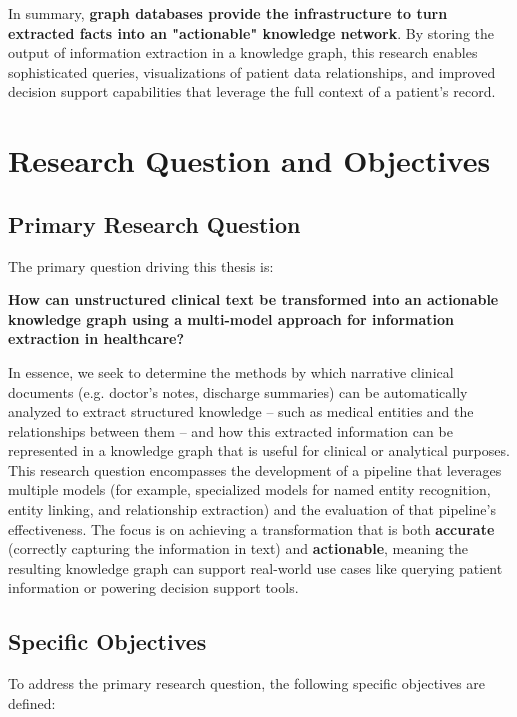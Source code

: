 In summary, \textbf{graph databases provide the infrastructure to turn extracted facts into an "actionable" knowledge network}. By storing the output of information extraction in a knowledge graph, this research enables sophisticated queries, visualizations of patient data relationships, and improved decision support capabilities that leverage the full context of a patient's record.


\section{Research Question and Objectives}

\subsection{Primary Research Question}

The primary question driving this thesis is:

\textbf{How can unstructured clinical text be transformed into an actionable knowledge graph using a multi-model approach for information extraction in healthcare?}

In essence, we seek to determine the methods by which narrative clinical documents (e.g. doctor's notes, discharge summaries) can be automatically analyzed to extract structured knowledge – such as medical entities and the relationships between them – and how this extracted information can be represented in a knowledge graph that is useful for clinical or analytical purposes. This research question encompasses the development of a pipeline that leverages multiple models (for example, specialized models for named entity recognition, entity linking, and relationship extraction) and the evaluation of that pipeline's effectiveness. The focus is on achieving a transformation that is both \textbf{accurate} (correctly capturing the information in text) and \textbf{actionable}, meaning the resulting knowledge graph can support real-world use cases like querying patient information or powering decision support tools.

\subsection{Specific Objectives}

To address the primary research question, the following specific objectives are defined:

